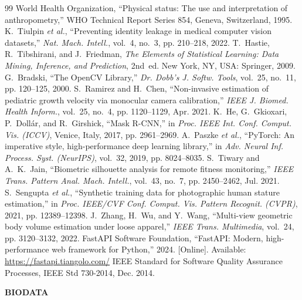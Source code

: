 \documentclass[12pt,a4paper,oneside]{report}
\begin{document}
\begin{thebibliography}{99}
 World Health Organization, ``Physical status: The use and interpretation of anthropometry,'' WHO Technical Report Series 854, Geneva, Switzerland, 1995.
 K.~Tiulpin \textit{et al.}, ``Preventing identity leakage in medical computer vision datasets,'' \textit{Nat. Mach. Intell.}, vol.~4, no.~3, pp. 210--218, 2022.
 T.~Hastie, R.~Tibshirani, and J.~Friedman, \textit{The Elements of Statistical Learning: Data Mining, Inference, and Prediction}, 2nd~ed. New York, NY, USA: Springer, 2009.
 G.~Bradski, ``The OpenCV Library,'' \textit{Dr. Dobb's J. Softw. Tools}, vol.~25, no.~11, pp. 120--125, 2000.
 S.~Ramirez and H.~Chen, ``Non-invasive estimation of pediatric growth velocity via monocular camera calibration,'' \textit{IEEE J. Biomed. Health Inform.}, vol.~25, no.~4, pp. 1120--1129, Apr. 2021.
 K.~He, G.~Gkioxari, P.~Doll{\'a}r, and R.~Girshick, ``Mask R-CNN,'' in \textit{Proc. IEEE Int. Conf. Comput. Vis. (ICCV)}, Venice, Italy, 2017, pp. 2961--2969.
 A.~Paszke \textit{et al.}, ``PyTorch: An imperative style, high-performance deep learning library,'' in \textit{Adv. Neural Inf. Process. Syst. (NeurIPS)}, vol.~32, 2019, pp. 8024--8035.
 S.~Tiwary and A.~K.~Jain, ``Biometric silhouette analysis for remote fitness monitoring,'' \textit{IEEE Trans. Pattern Anal. Mach. Intell.}, vol.~43, no.~7, pp. 2450--2462, Jul. 2021.
 S.~Sengupta \textit{et al.}, ``Synthetic training data for photographic human stature estimation,'' in \textit{Proc. IEEE/CVF Conf. Comput. Vis. Pattern Recognit. (CVPR)}, 2021, pp. 12389--12398.
 J.~Zhang, H.~Wu, and Y.~Wang, ``Multi-view geometric body volume estimation under loose apparel,'' \textit{IEEE Trans. Multimedia}, vol.~24, pp. 3120--3132, 2022.
 FastAPI Software Foundation, ``FastAPI: Modern, high-performance web framework for Python,'' 2024. [Online]. Available: \url{https://fastapi.tiangolo.com/}
 IEEE Standard for Software Quality Assurance Processes, IEEE Std 730-2014, Dec. 2014.
\end{thebibliography}

\clearpage
\begin{center}
{\Large\bfseries BIODATA\par}
\end{center}
\vspace{0.8cm}
\end{document}

